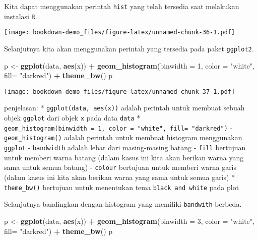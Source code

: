 \documentclass[
]{book}
\newenvironment{Shaded}{\begin{snugshade}}{\end{snugshade}}
\newcommand{\DataTypeTok}[1]{\textcolor[rgb]{0.13,0.29,0.53}{#1}}
\newcommand{\DecValTok}[1]{\textcolor[rgb]{0.00,0.00,0.81}{#1}}
\newcommand{\KeywordTok}[1]{\textcolor[rgb]{0.13,0.29,0.53}{\textbf{#1}}}
\newcommand{\NormalTok}[1]{#1}
\newcommand{\OperatorTok}[1]{\textcolor[rgb]{0.81,0.36,0.00}{\textbf{#1}}}
\newcommand{\StringTok}[1]{\textcolor[rgb]{0.31,0.60,0.02}{#1}}
\begin{document}
Kita dapat menggunakan perintah \texttt{hist} yang telah tersedia saat melakukan instalasi \texttt{R}.

\begin{Shaded}
\end{Shaded}

\texttt{[image: bookdown-demo\_files/figure-latex/unnamed-chunk-36-1.pdf]}

Selanjutnya kita akan menggunakan perintah yang tersedia pada paket \texttt{ggplot2}.

\begin{Shaded}
\begin{Highlighting}[]
\NormalTok{p <-}\StringTok{ }\KeywordTok{ggplot}\NormalTok{(data, }\KeywordTok{aes}\NormalTok{(x)) }\OperatorTok{+}\StringTok{ }
\StringTok{  }\KeywordTok{geom_histogram}\NormalTok{(}\DataTypeTok{binwidth =} \DecValTok{1}\NormalTok{, }
                 \DataTypeTok{color =} \StringTok{"white"}\NormalTok{, }
                 \DataTypeTok{fill=} \StringTok{"darkred"}\NormalTok{) }\OperatorTok{+}
\StringTok{  }\KeywordTok{theme_bw}\NormalTok{()}
\NormalTok{p}
\end{Highlighting}
\end{Shaded}

\texttt{[image: bookdown-demo\_files/figure-latex/unnamed-chunk-37-1.pdf]}

penjelasan:
* \texttt{ggplot(data,\ aes(x))} adalah perintah untuk membuat sebuah objek \texttt{ggplot} dari objek \texttt{x} pada data \texttt{data}
* \texttt{geom\_histogram(binwidth\ =\ 1,\ color\ =\ "white",\ fill=\ "darkred")}
- \texttt{geom\_histogram()} adalah perintah untuk membuat histogram menggunakan \texttt{ggplot}
- \texttt{bandwidth} adalah lebar dari masing-masing batang
- \texttt{fill} bertujuan untuk memberi warna batang (dalam kasus ini kita akan berikan warna yang sama untuk semua batang)
- \texttt{colour} bertujuan untuk memberi warna garis (dalam kasus ini kita akan berikan warna yang sama untuk semua garis)
* \texttt{theme\_bw()} bertujuan untuk menentukan tema \texttt{black\ and\ white} pada plot

Selanjutnya bandingkan dengan histogram yang memiliki \texttt{bandwith} berbeda.

\begin{Shaded}
\begin{Highlighting}[]
\NormalTok{p <-}\StringTok{ }\KeywordTok{ggplot}\NormalTok{(data, }\KeywordTok{aes}\NormalTok{(x)) }\OperatorTok{+}\StringTok{ }
\StringTok{  }\KeywordTok{geom_histogram}\NormalTok{(}\DataTypeTok{binwidth =} \DecValTok{3}\NormalTok{, }
                 \DataTypeTok{color =} \StringTok{"white"}\NormalTok{, }
                 \DataTypeTok{fill=} \StringTok{"darkred"}\NormalTok{) }\OperatorTok{+}
\StringTok{  }\KeywordTok{theme_bw}\NormalTok{()}
\NormalTok{p}
\end{Highlighting}
\end{Shaded}
\end{document}
